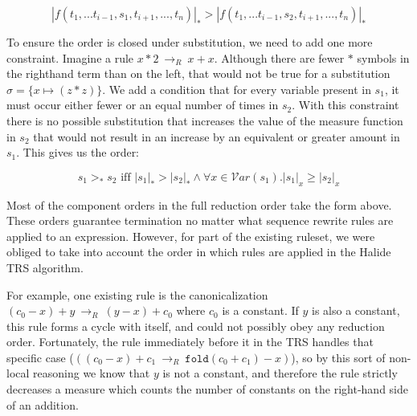 \documentclass[acmsmall,review]{acmart}\settopmatter{printfolios=true,printccs=false,printacmref=false}
\newcommand{\rewrites}[0]{\:\rightarrow_{R}\:}
\begin{document}
\[
|f(t_1,...t_{i-1},s_1,t_{i+1},...,t_n)|_* > |f(t_1,...t_{i-1},s_2,t_{i+1},...,t_n)|_*
\]

To ensure the order is closed under substitution, we need to add one more constraint. Imagine a rule $x * 2 \rewrites x + x$. Although there are fewer $*$ symbols in the righthand term than on the left, that would not be true for a substitution $\sigma = \{x \mapsto (z * z)\}$. We add a condition that for every variable present in $s_1$, it must occur either fewer or an equal number of times in $s_2$. With this constraint there is no possible substitution that increases the value of the measure function in $s_2$ that would not result in an increase by an equivalent or greater amount in $s_1$. This gives us the order:

\[
s_1 >_* s_2 \textrm{ iff } |s_1|_* > |s_2|_* \wedge \forall x \in \mathcal{V}ar(s_1) . |s_1|_x \geq |s_2|_x
\]

Most of the component orders in the full reduction order take the form above. These orders guarantee termination no matter what sequence rewrite rules are applied to an expression. However, for part of the existing ruleset, we were obliged to take into account the order in which rules are applied in the Halide TRS algorithm.

For example, one existing rule is the canonicalization $(c_0 - x) + y \rewrites (y - x) + c_0$ where $c_0$ is a constant. If $y$ is also a constant, this rule forms a cycle with itself, and could not possibly obey any reduction order. Fortunately, the rule immediately before it in the TRS handles that specific case ($((c_0 - x) + c_1 \rewrites \texttt{fold}(c_0 + c_1) - x)$), so by this sort of non-local reasoning we know that $y$ is not a constant, and therefore the rule strictly decreases a measure which counts the number of constants on the right-hand side of an addition.


\end{document}
